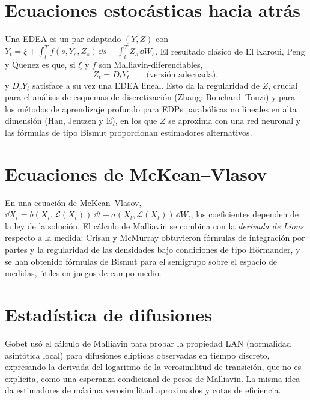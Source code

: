 \section{Ecuaciones estocásticas hacia atrás}
Una EDEA es un par adaptado $(Y,Z)$ con $Y_t=\xi+\int_t^Tf(s,Y_s,Z_s)\,\dd s-\int_t^TZ_s\,\dd W_s$. El resultado
clásico de El Karoui, Peng y Quenez es que, si $\xi$ y $f$ son Malliavin-diferenciables,
\[
  Z_t=D_tY_t\qquad\text{(versión adecuada)},
\]
y $D_rY_t$ satisface a su vez una EDEA lineal. Esto da la regularidad de $Z$, crucial para el análisis
de esquemas de discretización (Zhang; Bouchard--Touzi) y para los métodos de aprendizaje
profundo para EDPs parabólicas no lineales en alta dimensión (Han, Jentzen y E), en los que
$Z$ se aproxima con una red neuronal y las fórmulas de tipo Bismut proporcionan estimadores
alternativos.

\section{Ecuaciones de McKean--Vlasov}
En una ecuación de McKean--Vlasov, $\dd X_t=b(X_t,\mathcal L(X_t))\,\dd t+\sigma(X_t,\mathcal L(X_t))\,\dd W_t$, los coeficientes
dependen de la ley de la solución. El cálculo de Malliavin se combina con la \emph{derivada de Lions}
respecto a la medida: Crisan y McMurray obtuvieron fórmulas de integración por partes y la
regularidad de las densidades bajo condiciones de tipo Hörmander, y se han obtenido fórmulas
de Bismut para el semigrupo sobre el espacio de medidas, útiles en juegos de campo medio.

\section{Estadística de difusiones}
Gobet usó el cálculo de Malliavin para probar la propiedad LAN (normalidad asintótica local)
para difusiones elípticas observadas en tiempo discreto, expresando la derivada del logaritmo de
la verosimilitud de transición, que no es explícita, como una esperanza condicional de pesos
de Malliavin. La misma idea da estimadores de máxima verosimilitud aproximados y cotas de
eficiencia.

